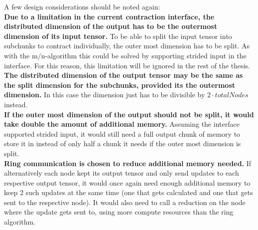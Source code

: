 A few design considerations should be noted again:\\
\textbf{Due to a limitation in the current contraction interface, the distributed dimension of the output has to be the outermost dimension of its input tensor.}
To be able to split the input tensor into subchunks to contract individually, the outer most dimension has to be split.
As with the m/n-algorithm this could be solved by supporting strided input in the interface.
For this reason, this limitation will be ignored in the rest of the thesis.\\
\textbf{The distributed dimension of the output tensor may be the same as the split dimension for the subchunks, provided its the outermost dimension.}
In this case the dimension just has to be divisible by $2 \cdot totalNodes$ instead.\\
\textbf{If the outer most dimension of the output should not be split, it would take double the amount of additional memory.}
Assuming the interface supported strided input, it would still need a full output chunk of memory to store it in instead of only half a chunk it needs if the outer most dimension is split.\\
\textbf{Ring communication is chosen to reduce additional memory needed.}
If alternatively each node kept its output tensor and only send updates to each respective output tensor, it would once again need enough additional memory to keep 2 such updates at the same time (one that gets calculated and one that gets sent to the respective node).
It would also need to call a reduction on the node where the update gets sent to, using more compute resources than the ring algorithm.


